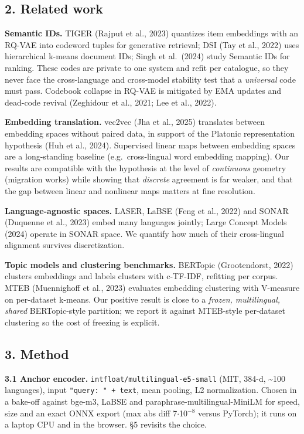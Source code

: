 \documentclass[
  10pt,
]{article}
\begin{document}
\hypertarget{related-work}{%
\subsection{2. Related work}\label{related-work}}

\textbf{Semantic IDs.} TIGER (Rajput et al., 2023) quantizes item
embeddings with an RQ-VAE into codeword tuples for generative retrieval;
DSI (Tay et al., 2022) uses hierarchical k-means document IDs; Singh et
al.~(2024) study Semantic IDs for ranking. These codes are private to
one system and refit per catalogue, so they never face the
cross-language and cross-model stability test that a \emph{universal}
code must pass. Codebook collapse in RQ-VAE is mitigated by EMA updates
and dead-code revival (Zeghidour et al., 2021; Lee et al., 2022).

\textbf{Embedding translation.} vec2vec (Jha et al., 2025) translates
between embedding spaces without paired data, in support of the Platonic
representation hypothesis (Huh et al., 2024). Supervised linear maps
between embedding spaces are a long-standing baseline
(e.g.~cross-lingual word embedding mapping). Our results are compatible
with the hypothesis at the level of \emph{continuous} geometry
(migration works) while showing that \emph{discrete} agreement is far
weaker, and that the gap between linear and nonlinear maps matters at
fine resolution.

\textbf{Language-agnostic spaces.} LASER, LaBSE (Feng et al., 2022) and
SONAR (Duquenne et al., 2023) embed many languages jointly; Large
Concept Models (2024) operate in SONAR space. We quantify how much of
their cross-lingual alignment survives discretization.

\textbf{Topic models and clustering benchmarks.} BERTopic (Grootendorst,
2022) clusters embeddings and labels clusters with c-TF-IDF, refitting
per corpus. MTEB (Muennighoff et al., 2023) evaluates embedding
clustering with V-measure on per-dataset k-means. Our positive result is
close to a \emph{frozen, multilingual, shared} BERTopic-style partition;
we report it against MTEB-style per-dataset clustering so the cost of
freezing is explicit.

\hypertarget{method}{%
\subsection{3. Method}\label{method}}

\textbf{3.1 Anchor encoder.} \texttt{intfloat/multilingual-e5-small}
(MIT, 384-d, \textasciitilde100 languages), input
\texttt{"query:\ "\ +\ text}, mean pooling, L2 normalization. Chosen in
a bake-off against bge-m3, LaBSE and paraphrase-multilingual-MiniLM for
speed, size and an exact ONNX export (max abs diff 7$\cdot$10$^{-8}$ versus
PyTorch); it runs on a laptop CPU and in the browser. \S{}5 revisits the
choice.
\end{document}
